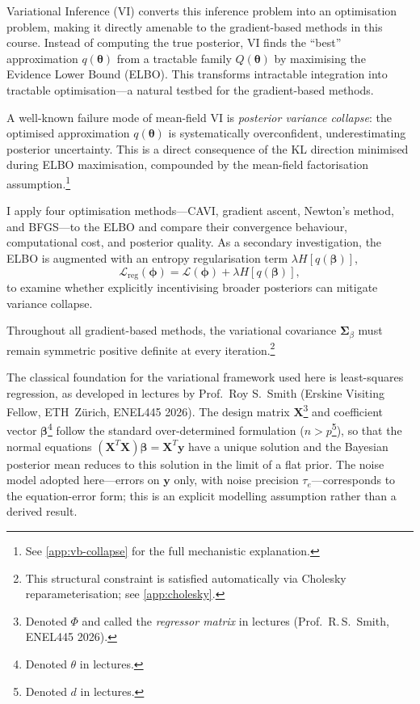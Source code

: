 \documentclass[11pt,a4paper]{article}
\begin{document}
Variational Inference (VI) converts this inference problem into an optimisation problem, making it directly amenable to the gradient-based methods in this course.
Instead of computing the true posterior, VI finds the ``best'' approximation $q(\bm{\theta})$ from a tractable family $Q(\bm{\theta})$
by maximising the Evidence Lower Bound (ELBO). 
This transforms intractable integration into tractable optimisation---a natural testbed for the gradient-based methods.

A well-known failure mode of mean-field VI is \emph{posterior variance collapse}:
the optimised approximation $q(\bm{\theta})$ is systematically overconfident,
underestimating posterior uncertainty. This is a direct consequence of the KL direction minimised during ELBO maximisation,
compounded by the mean-field factorisation assumption.\footnote{See \ref{app:vb-collapse} for the full mechanistic explanation.}

I apply four optimisation methods---CAVI, gradient ascent, Newton's method, and BFGS---to the ELBO and compare their convergence behaviour, computational cost, and posterior quality.
As a secondary investigation, the ELBO is augmented with an entropy regularisation term $\lambda H[q(\bm{\beta})]$,
\begin{equation*}
    \mathcal{L}_{\mathrm{reg}}(\bm{\phi}) = \mathcal{L}(\bm{\phi}) + \lambda H[q(\bm{\beta})],
\end{equation*}
to examine whether explicitly incentivising broader posteriors can mitigate variance collapse.

Throughout all gradient-based methods, the variational covariance $\bm{\Sigma}_\beta$ must remain symmetric positive definite at every iteration.\footnote{This structural constraint is satisfied automatically via Cholesky reparameterisation; see \ref{app:cholesky}.}

The classical foundation for the variational framework used here is least-squares regression,
as developed in lectures by Prof.\ Roy S.\ Smith (Erskine Visiting Fellow, ETH~Z\"{u}rich,
ENEL445 2026). The design matrix $\bm{X}$\footnote{Denoted $\Phi$ and called the
\emph{regressor matrix} in lectures (Prof.\ R.\,S.\ Smith, ENEL445 2026).} and coefficient
vector $\bm{\beta}$\footnote{Denoted $\theta$ in lectures.} follow the standard
over-determined formulation ($n > p$\footnote{Denoted $d$ in lectures.}), so that the normal
equations $(\bm{X}^T\bm{X})\bm{\beta} = \bm{X}^T\bm{y}$ have a unique solution and the
Bayesian posterior mean reduces to this solution in the limit of a flat prior. The noise model
adopted here---errors on $\bm{y}$ only, with noise precision $\tau_e$---corresponds to the
equation-error form; this is an explicit modelling assumption rather than a derived result.
\end{document}
